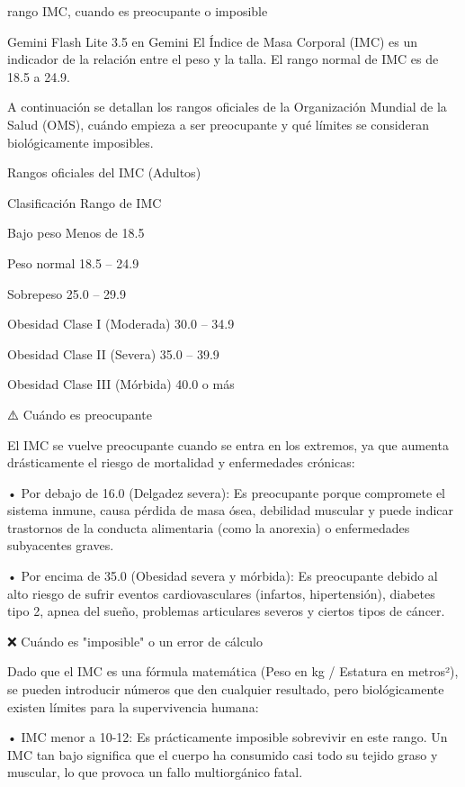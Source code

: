 \documentclass[12pt,a4paper,oneside]{book}
\begin{document}
\begin{iaprompt}
rango IMC, cuando es preocupante o imposible
\end{iaprompt}
\begin{iaresp} {Gemini Flash Lite 3.5 en Gemini}
El Índice de Masa Corporal (IMC) es un indicador de la relación entre el peso y la talla. El rango normal de IMC es de 18.5 a 24.9.

A continuación se detallan los rangos oficiales de la Organización Mundial de la Salud (OMS), cuándo empieza a ser preocupante y qué límites se consideran biológicamente imposibles.

Rangos oficiales del IMC (Adultos)


Clasificación	Rango de IMC

Bajo peso	Menos de 18.5

Peso normal	18.5 – 24.9

Sobrepeso	25.0 – 29.9

Obesidad Clase I (Moderada)	30.0 – 34.9

Obesidad Clase II (Severa)	35.0 – 39.9

Obesidad Clase III (Mórbida)	40.0 o más


⚠️ Cuándo es preocupante

El IMC se vuelve preocupante cuando se entra en los extremos, ya que aumenta drásticamente el riesgo de mortalidad y enfermedades crónicas:

• Por debajo de 16.0 (Delgadez severa): Es preocupante porque compromete el sistema inmune, causa pérdida de masa ósea, debilidad muscular y puede indicar trastornos de la conducta alimentaria (como la anorexia) o enfermedades subyacentes graves.

• Por encima de 35.0 (Obesidad severa y mórbida): Es preocupante debido al alto riesgo de sufrir eventos cardiovasculares (infartos, hipertensión), diabetes tipo 2, apnea del sueño, problemas articulares severos y ciertos tipos de cáncer.

❌ Cuándo es "imposible" o un error de cálculo

Dado que el IMC es una fórmula matemática (Peso en kg / Estatura en metros²), se pueden introducir números que den cualquier resultado, pero biológicamente existen límites para la supervivencia humana:

• IMC menor a 10-12: Es prácticamente imposible sobrevivir en este rango. Un IMC tan bajo significa que el cuerpo ha consumido casi todo su tejido graso y muscular, lo que provoca un fallo multiorgánico fatal.


\end{iaresp}
\end{document}
